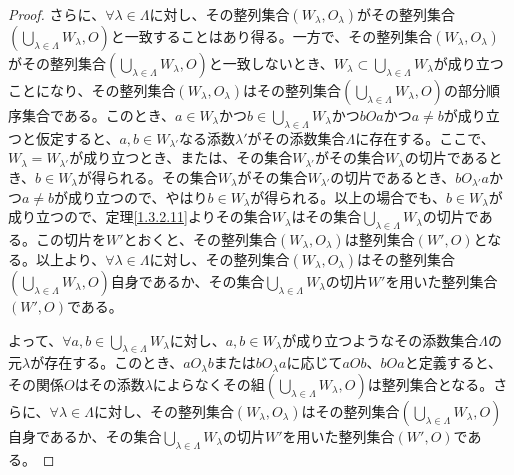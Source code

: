 \documentclass[dvipdfmx]{jsarticle}
\begin{document}
\begin{proof}
さらに、$\forall\lambda \in \varLambda $に対し、その整列集合$\left( W_{\lambda},O_{\lambda} \right)$がその整列集合$\left( \bigcup_{\lambda \in \varLambda } W_{\lambda},O \right)$と一致することはあり得る。一方で、その整列集合$\left( W_{\lambda},O_{\lambda} \right)$がその整列集合$\left( \bigcup_{\lambda \in \varLambda } W_{\lambda},O \right)$と一致しないとき、$W_{\lambda} \subset \bigcup_{\lambda \in \varLambda } W_{\lambda}$が成り立つことになり、その整列集合$\left( W_{\lambda},O_{\lambda} \right)$はその整列集合$\left( \bigcup_{\lambda \in \varLambda } W_{\lambda},O \right)$の部分順序集合である。このとき、$a \in W_{\lambda}$かつ$b \in \bigcup_{\lambda \in \varLambda } W_{\lambda}$かつ$bOa$かつ$a \neq b$が成り立つと仮定すると、$a,b \in W_{\lambda'}$なる添数$\lambda'$がその添数集合$\varLambda $に存在する。ここで、$W_{\lambda} = W_{\lambda'}$が成り立つとき、または、その集合$W_{\lambda'}$がその集合$W_{\lambda}$の切片であるとき、$b \in W_{\lambda}$が得られる。その集合$W_{\lambda}$がその集合$W_{\lambda'}$の切片であるとき、$bO_{\lambda'}a$かつ$a \neq b$が成り立つので、やはり$b \in W_{\lambda}$が得られる。以上の場合でも、$b \in W_{\lambda}$が成り立つので、定理\ref{1.3.2.11}よりその集合$W_{\lambda}$はその集合$\bigcup_{\lambda \in \varLambda } W_{\lambda}$の切片である。この切片を$W'$とおくと、その整列集合$\left( W_{\lambda},O_{\lambda} \right)$は整列集合$\left( W',O \right)$となる。以上より、$\forall\lambda \in \varLambda $に対し、その整列集合$\left( W_{\lambda},O_{\lambda} \right)$はその整列集合$\left( \bigcup_{\lambda \in \varLambda } W_{\lambda},O \right)$自身であるか、その集合$\bigcup_{\lambda \in \varLambda } W_{\lambda}$の切片$W'$を用いた整列集合$\left( W',O \right)$である。\par
よって、$\forall a,b \in \bigcup_{\lambda \in \varLambda } W_{\lambda}$に対し、$a,b \in W_{\lambda}$が成り立つようなその添数集合$\varLambda $の元$\lambda$が存在する。このとき、$aO_{\lambda}b$または$bO_{\lambda}a$に応じて$aOb$、$bOa$と定義すると、その関係$O$はその添数$\lambda$によらなくその組$\left( \bigcup_{\lambda \in \varLambda } W_{\lambda},O \right)$は整列集合となる。さらに、$\forall\lambda \in \varLambda $に対し、その整列集合$\left( W_{\lambda},O_{\lambda} \right)$はその整列集合$\left( \bigcup_{\lambda \in \varLambda } W_{\lambda},O \right)$自身であるか、その集合$\bigcup_{\lambda \in \varLambda } W_{\lambda}$の切片$W'$を用いた整列集合$\left( W',O \right)$である。
\end{proof}
\end{document}
